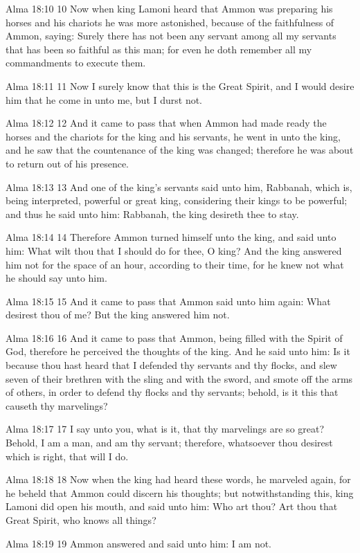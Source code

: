 Alma 18:10
 10 Now when king Lamoni heard that Ammon was preparing his
horses and his chariots he was more astonished, because of the
faithfulness of Ammon, saying: Surely there has not been any
servant among all my servants that has been so faithful as this
man; for even he doth remember all my commandments to execute
them.

Alma 18:11
 11 Now I surely know that this is the Great Spirit, and I would
desire him that he come in unto me, but I durst not.

Alma 18:12
 12 And it came to pass that when Ammon had made ready the horses
and the chariots for the king and his servants, he went in unto
the king, and he saw that the countenance of the king was
changed; therefore he was about to return out of his presence.

Alma 18:13
 13 And one of the king's servants said unto him, Rabbanah, which
is, being interpreted, powerful or great king, considering their
kings to be powerful; and thus he said unto him: Rabbanah, the
king desireth thee to stay.

Alma 18:14
 14 Therefore Ammon turned himself unto the king, and said unto
him: What wilt thou that I should do for thee, O king? And the
king answered him not for the space of an hour, according to
their time, for he knew not what he should say unto him.

Alma 18:15
 15 And it came to pass that Ammon said unto him again: What
desirest thou of me? But the king answered him not.

Alma 18:16
 16 And it came to pass that Ammon, being filled with the Spirit
of God, therefore he perceived the thoughts of the king. And he
said unto him: Is it because thou hast heard that I defended thy
servants and thy flocks, and slew seven of their brethren with
the sling and with the sword, and smote off the arms of others,
in order to defend thy flocks and thy servants; behold, is it
this that causeth thy marvelings?

Alma 18:17
 17 I say unto you, what is it, that thy marvelings are so great?
Behold, I am a man, and am thy servant; therefore, whatsoever
thou desirest which is right, that will I do.

Alma 18:18
 18 Now when the king had heard these words, he marveled again,
for he beheld that Ammon could discern his thoughts; but
notwithstanding this, king Lamoni did open his mouth, and said
unto him: Who art thou? Art thou that Great Spirit, who knows
all things?

Alma 18:19
 19 Ammon answered and said unto him: I am not.

